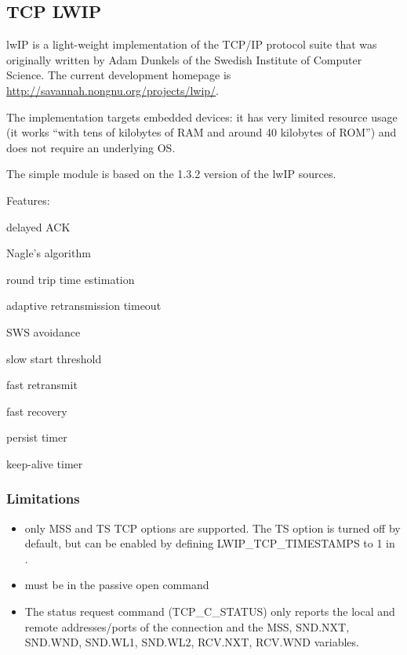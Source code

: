\subsection{TCP LWIP}

lwIP is a light-weight implementation of the TCP/IP protocol suite
that was originally written by Adam Dunkels of the Swedish Institute of
Computer Science. The current development homepage is
\url{http://savannah.nongnu.org/projects/lwip/}.

The implementation targets embedded devices: it has
very limited resource usage (it works ``with tens of kilobytes of RAM and
around 40 kilobytes of ROM'') and does not require an underlying OS.

The  simple module is based on the 1.3.2 version of
the lwIP sources.

Features:

\begin{compactitem}
\item delayed ACK
\item Nagle's algorithm
\item round trip time estimation
\item adaptive retransmission timeout
\item SWS avoidance
\item slow start threshold
\item fast retransmit
\item fast recovery
\item persist timer
\item keep-alive timer
\end{compactitem}

\subsubsection*{Limitations}

\begin{itemize}
  \item only MSS and TS TCP options are supported. The TS option is turned off
        by default, but can be enabled by defining LWIP\_TCP\_TIMESTAMPS to 1
        in .
  \item {} must be  in the passive open command
  \item The status request command (TCP\_C\_STATUS) only reports the
          local and remote addresses/ports of the connection and
          the MSS, SND.NXT, SND.WND, SND.WL1, SND.WL2, RCV.NXT, RCV.WND variables.
\end{itemize}

